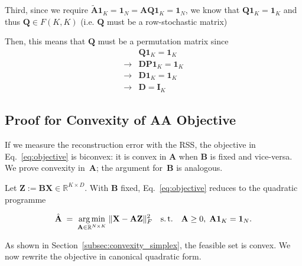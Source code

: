 \documentclass{article}
\begin{document}
Third, since we require $\tilde{\mathbf{A}} \mathbf{1}_K = \mathbf{1}_N = \mathbf{A} \mathbf{Q} \mathbf{1}_K = \mathbf{1}_N$, we know that $\mathbf{Q} \mathbf{1}_K = \mathbf{1}_K$ and thus $\mathbf{Q} \in F(K, K)$ (i.e. $\mathbf{Q}$ must be a row-stochastic matrix)

Then, this means that $\mathbf{Q}$ must be a permutation matrix since
\begin{equation}
    \begin{aligned}
        &\mathbf{Q} \mathbf{1}_K = \mathbf{1}_K \\
        \rightarrow &\mathbf{D} \mathbf{P} \mathbf{1}_K = \mathbf{1}_K \\
        \rightarrow &\mathbf{D} \mathbf{1}_K = \mathbf{1}_K \\
        \rightarrow &\mathbf{D} = \mathbf{I}_K
    \end{aligned}
\end{equation}


\subsection{Proof for Convexity of AA Objective}
\label{subsec:proof_convexity}

If we measure the reconstruction error with the RSS, the objective in Eq.~\eqref{eq:objective} is biconvex: it is convex in $\mathbf{A}$ when $\mathbf{B}$ is fixed and vice-versa. We prove convexity in~$\mathbf{A}$; the argument for~$\mathbf{B}$ is analogous.

Let $\mathbf Z := \mathbf{B} \mathbf{X} \in \mathbb R^{K\times D}$. With $\mathbf{B}$ fixed, Eq.~\eqref{eq:objective} reduces to the quadratic programme

\begin{equation}
\label{eq:A_subproblem}
    \hat{\mathbf{A}}\;=\;
    \underset{\mathbf{A}\in\mathbb R^{N\times K}}{\arg\min}\;
    \|\mathbf X-\mathbf{A}\mathbf Z\|_F^{2}
    \quad\text{s.\,t.}\quad
    \mathbf{A}\ge0,\;
    \mathbf{A}\mathbf 1_K=\mathbf 1_N .
\end{equation}

As shown in Section~\ref{subsec:convexity_simplex}, the feasible set is convex. We now rewrite the objective in canonical quadratic form.
\end{document}
